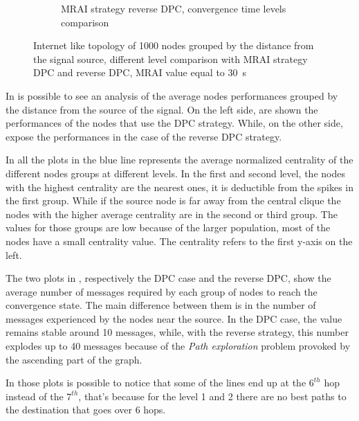 \begin{figure}[h]
\begin{subfigure}[b]{0.49\textwidth}
		 \caption{\ac{MRAI} strategy reverse \ac{DPC}, convergence time levels comparison}
         \label{fig:different_levels_comparison_reverse_dpc_time}
     \end{subfigure}
     \hfill
	 \caption{Internet like topology of \num{1000} nodes grouped by the distance
	 from the signal source, different level comparison with \ac{MRAI} strategy
		\ac{DPC} and reverse \ac{DPC}, \ac{MRAI} value equal to \SI{30}{\second}}
	 \label{fig:different_levels_comparison}
\end{figure}

In  is possible to see an analysis of the
average nodes performances grouped by the distance from the source of the signal.
On the left side,
are shown the performances of the nodes that use the \ac{DPC} strategy.
While, on the other side, 
expose the performances in the case of the reverse \ac{DPC} strategy.

In all the plots in  the blue line
represents the average normalized centrality of the different nodes groups at different
levels.
In the first and second level, the nodes with the highest centrality are the
nearest ones, it is deductible from the spikes in the first group.
While if the source node is far away from the central clique the nodes with the
higher average centrality are in the second or third group.
The values for those groups are low because of the larger population,
most of the nodes have a small centrality value.
The centrality refers to the first y-axis on the left.

The two plots in ,
respectively the \ac{DPC} case and the reverse \ac{DPC},
show the average number of messages required by each group of nodes to reach
the convergence state.
The main difference between them is in the number of messages experienced by
the nodes near the source.
In the \ac{DPC} case, the value remains stable around \num{10} messages, while,
with the reverse strategy, this number explodes up to \num{40} messages because
of the \textit{Path exploration} problem provoked by the ascending part of the graph.

In those plots is possible to notice that some of the lines end up at the $6^{th}$ hop instead
of the $7^{th}$, that's because for the level \num{1} and \num{2} there are
no best paths to the destination that goes over \num{6} hops.

